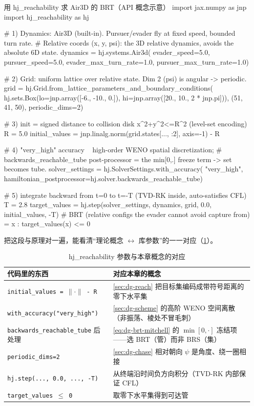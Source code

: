 \begin{codebox}[Python]{用 hj\_reachability 求 Air3D 的 BRT（API 概念示意）}
import jax.numpy as jnp
import hj_reachability as hj

# 1) Dynamics: Air3D (built-in). Pursuer/evader fly at fixed speed, bounded turn rate.
#    Relative coords (x, y, psi): the 3D relative dynamics, avoids the absolute 6D state.
dynamics = hj.systems.Air3d(
    evader_speed=5.0, pursuer_speed=5.0,
    evader_max_turn_rate=1.0, pursuer_max_turn_rate=1.0)

# 2) Grid: uniform lattice over relative state. Dim 2 (psi) is angular -> periodic.
grid = hj.Grid.from_lattice_parameters_and_boundary_conditions(
    hj.sets.Box(lo=jnp.array([-6., -10., 0.]),
                hi=jnp.array([20.,  10., 2 * jnp.pi])),
    (51, 41, 50), periodic_dims=2)

# 3) init = signed distance to collision disk {x^2+y^2<=R^2} (level-set encoding)
R = 5.0
initial_values = jnp.linalg.norm(grid.states[..., :2], axis=-1) - R

# 4) "very_high" accuracy ~ high-order WENO spatial discretization;
#    backwards_reachable_tube post-processor = the min[0,.] freeze term -> set becomes tube.
solver_settings = hj.SolverSettings.with_accuracy(
    "very_high",
    hamiltonian_postprocessor=hj.solver.backwards_reachable_tube)

# 5) integrate backward from t=0 to t=-T (TVD-RK inside, auto-satisfies CFL)
T = 2.8
target_values = hj.step(solver_settings, dynamics, grid, 0.0, initial_values, -T)
# BRT (relative configs the evader cannot avoid capture from) = {x : target_values(x) <= 0}
\end{codebox}

把这段与原理对一遍，能看清“理论概念 $\leftrightarrow$ 库参数”的一一对应（\cref{tab:dg-api}）。

\begin{table}[H]\centering\small
\caption{hj\_reachability 参数与本章概念的对应}
\label{tab:dg-api}
\begin{tabular}{p{} p{}}
\toprule
代码里的东西 & 对应本章的概念 \\
\midrule
\texttt{initial\_values = $\lVert\cdot\rVert$ - R} & \cref{sec:dg-reach} 把目标集编码成带符号距离的零下水平集 \\
\texttt{with\_accuracy("very\_high")} & \cref{sec:dg-scheme} 的高阶 WENO 空间离散（非振荡、棱处不冒毛刺） \\
\texttt{backwards\_reachable\_tube} 后处理 & \cref{eq:dg-brt-mitchell} 的 $\min[0,\cdot]$ 冻结项——选 BRT（管）而非 BRS（集） \\
\texttt{periodic\_dims=2} & \cref{sec:dg-chase} 相对朝向 $\psi$ 是角度、绕一圈相接 \\
\texttt{hj.step(..., 0.0, ..., -T)} & 从终端沿时间负方向积分（TVD-RK 内部保证 CFL） \\
\texttt{target\_values $\le$ 0} & 取零下水平集得到可达管 \\
\bottomrule
\end{tabular}
\end{table}

